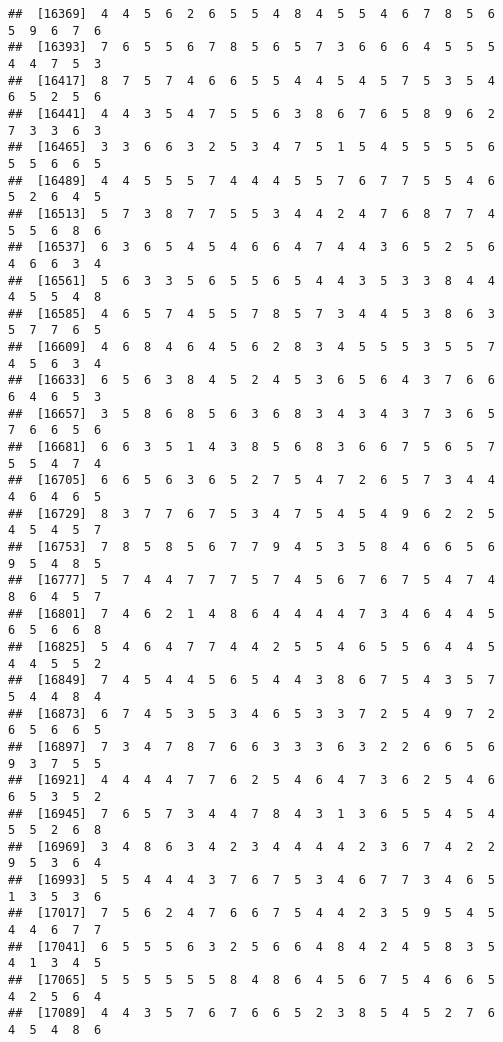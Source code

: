 \documentclass[
]{book}
\begin{document}
\begin{verbatim}
##  [16369]  4  4  5  6  2  6  5  5  4  8  4  5  5  4  6  7  8  5  6  5  9  6  7  6
##  [16393]  7  6  5  5  6  7  8  5  6  5  7  3  6  6  6  4  5  5  5  4  4  7  5  3
##  [16417]  8  7  5  7  4  6  6  5  5  4  4  5  4  5  7  5  3  5  4  6  5  2  5  6
##  [16441]  4  4  3  5  4  7  5  5  6  3  8  6  7  6  5  8  9  6  2  7  3  3  6  3
##  [16465]  3  3  6  6  3  2  5  3  4  7  5  1  5  4  5  5  5  5  6  5  5  6  6  5
##  [16489]  4  4  5  5  5  7  4  4  4  5  5  7  6  7  7  5  5  4  6  5  2  6  4  5
##  [16513]  5  7  3  8  7  7  5  5  3  4  4  2  4  7  6  8  7  7  4  5  5  6  8  6
##  [16537]  6  3  6  5  4  5  4  6  6  4  7  4  4  3  6  5  2  5  6  4  6  6  3  4
##  [16561]  5  6  3  3  5  6  5  5  6  5  4  4  3  5  3  3  8  4  4  4  5  5  4  8
##  [16585]  4  6  5  7  4  5  5  7  8  5  7  3  4  4  5  3  8  6  3  5  7  7  6  5
##  [16609]  4  6  8  4  6  4  5  6  2  8  3  4  5  5  5  3  5  5  7  4  5  6  3  4
##  [16633]  6  5  6  3  8  4  5  2  4  5  3  6  5  6  4  3  7  6  6  6  4  6  5  3
##  [16657]  3  5  8  6  8  5  6  3  6  8  3  4  3  4  3  7  3  6  5  7  6  6  5  6
##  [16681]  6  6  3  5  1  4  3  8  5  6  8  3  6  6  7  5  6  5  7  5  5  4  7  4
##  [16705]  6  6  5  6  3  6  5  2  7  5  4  7  2  6  5  7  3  4  4  4  6  4  6  5
##  [16729]  8  3  7  7  6  7  5  3  4  7  5  4  5  4  9  6  2  2  5  4  5  4  5  7
##  [16753]  7  8  5  8  5  6  7  7  9  4  5  3  5  8  4  6  6  5  6  9  5  4  8  5
##  [16777]  5  7  4  4  7  7  7  5  7  4  5  6  7  6  7  5  4  7  4  8  6  4  5  7
##  [16801]  7  4  6  2  1  4  8  6  4  4  4  4  7  3  4  6  4  4  5  6  5  6  6  8
##  [16825]  5  4  6  4  7  7  4  4  2  5  5  4  6  5  5  6  4  4  5  4  4  5  5  2
##  [16849]  7  4  5  4  4  5  6  5  4  4  3  8  6  7  5  4  3  5  7  5  4  4  8  4
##  [16873]  6  7  4  5  3  5  3  4  6  5  3  3  7  2  5  4  9  7  2  6  5  6  6  5
##  [16897]  7  3  4  7  8  7  6  6  3  3  3  6  3  2  2  6  6  5  6  9  3  7  5  5
##  [16921]  4  4  4  4  7  7  6  2  5  4  6  4  7  3  6  2  5  4  6  6  5  3  5  2
##  [16945]  7  6  5  7  3  4  4  7  8  4  3  1  3  6  5  5  4  5  4  5  5  2  6  8
##  [16969]  3  4  8  6  3  4  2  3  4  4  4  4  2  3  6  7  4  2  2  9  5  3  6  4
##  [16993]  5  5  4  4  4  3  7  6  7  5  3  4  6  7  7  3  4  6  5  1  3  5  3  6
##  [17017]  7  5  6  2  4  7  6  6  7  5  4  4  2  3  5  9  5  4  5  4  4  6  7  7
##  [17041]  6  5  5  5  6  3  2  5  6  6  4  8  4  2  4  5  8  3  5  4  1  3  4  5
##  [17065]  5  5  5  5  5  5  8  4  8  6  4  5  6  7  5  4  6  6  5  4  2  5  6  4
##  [17089]  4  4  3  5  7  6  7  6  6  5  2  3  8  5  4  5  2  7  6  4  5  4  8  6

\end{verbatim}
\end{document}
